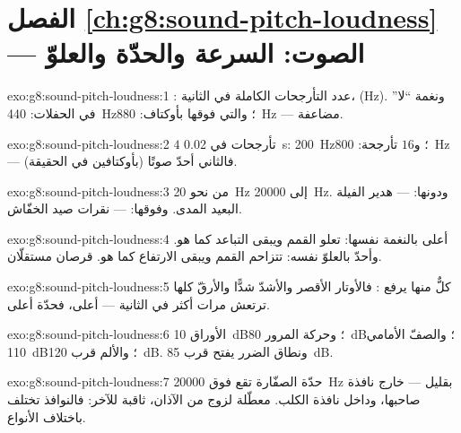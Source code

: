 \section*{الفصل \ref{ch:g8:sound-pitch-loudness} --- الصوت: السرعة والحدّة والعلوّ}

\begin{solution}{exo:g8:sound-pitch-loudness:1}
: عدد التأرجحات الكاملة في الثانية، 
(\unit{Hz}). ونغمة ``لا'' في الحفلات: \qty{440}{Hz}؛ والتي
فوقها بأوكتاف: \qty{880}{Hz} --- مضاعفة.
\end{solution}

\begin{solution}{exo:g8:sound-pitch-loudness:2}
$4$ تأرجحات في \qty{0.02}{s}: \qty{200}{Hz}؛ و$16$ تأرجحة:
\qty{800}{Hz} --- فالثاني أحدّ صوتًا (بأوكتافين في الحقيقة).
\end{solution}

\begin{solution}{exo:g8:sound-pitch-loudness:3}
من نحو \qty{20}{Hz} إلى \qty{20000}{Hz}. ودونها:  --- هدير الفيلة البعيد المدى. وفوقها:  --- نقرات صيد الخفّاش.
\end{solution}

\begin{solution}{exo:g8:sound-pitch-loudness:4}
أعلى بالنغمة نفسها: تعلو القمم ويبقى التباعد كما هو. وأحدّ
بالعلوّ نفسه: تتزاحم القمم ويبقى الارتفاع كما هو. قرصان
مستقلّان.
\end{solution}

\begin{solution}{exo:g8:sound-pitch-loudness:5}
كلٌّ منها يرفع : فالأوتار الأقصر والأشدّ شدًّا والأرقّ
كلها ترتعش مرات أكثر في الثانية ---  أعلى، فحدّة أعلى.
\end{solution}

\begin{solution}{exo:g8:sound-pitch-loudness:6}
الأوراق \qty{10}{dB}؛ وحركة المرور \qty{80}{dB}؛ والصفّ
الأمامي \qty{110}{dB}؛ والألم قرب \qty{120}{dB}. ونطاق الضرر
يفتح قرب \qty{85}{dB}.
\end{solution}

\begin{solution}{exo:g8:sound-pitch-loudness:7}
حدّة الصفّارة تقع فوق \qty{20000}{Hz} بقليل --- خارج نافذة
صاحبها، وداخل نافذة الكلب. معطّلة لزوج من الآذان، ثاقبة
للآخر: فالنوافذ تختلف باختلاف الأنواع.
\end{solution}

